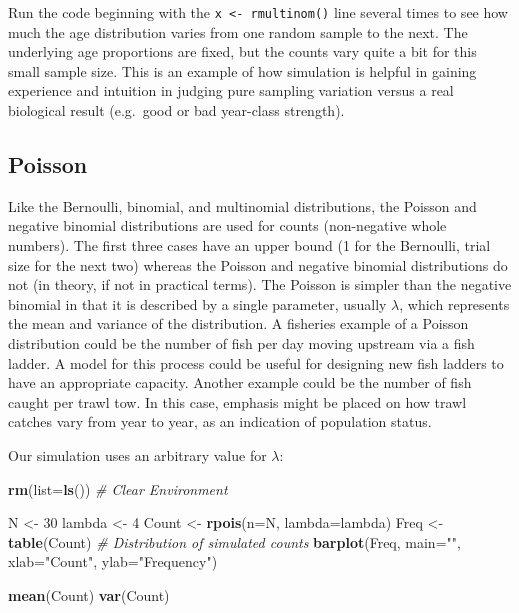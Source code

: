 \documentclass[
]{krantz}
\makeatletter
\newenvironment{Shaded}{\begin{snugshade}}{\end{snugshade}}
\newcommand{\AttributeTok}[1]{\textcolor[rgb]{0.27,0.27,0.27}{#1}}
\newcommand{\CommentTok}[1]{\textcolor[rgb]{0.37,0.37,0.37}{\textit{#1}}}
\newcommand{\DecValTok}[1]{\textcolor[rgb]{0.06,0.06,0.06}{#1}}
\newcommand{\FunctionTok}[1]{\textcolor[rgb]{0.27,0.27,0.27}{\textbf{#1}}}
\newcommand{\NormalTok}[1]{#1}
\newcommand{\OtherTok}[1]{\textcolor[rgb]{0.37,0.37,0.37}{#1}}
\newcommand{\StringTok}[1]{\textcolor[rgb]{0.5,0.5,0.5}{#1}}
\newenvironment{kframe}{%
\medskip{}
\setlength{\fboxsep}{.8em}
 \def\at@end@of@kframe{}%
 \ifinner\ifhmode%
  \def\at@end@of@kframe{\end{minipage}}%
  \begin{minipage}{\columnwidth}%
 \fi\fi%
 \def\FrameCommand##1{\hskip\@totalleftmargin \hskip-\fboxsep
 \colorbox{shadecolor}{##1}\hskip-\fboxsep
     \hskip-\linewidth \hskip-\@totalleftmargin \hskip\columnwidth}%
 \MakeFramed {\advance\hsize-\width
   \@totalleftmargin\z@ \linewidth\hsize
   \@setminipage}}%
 {\par\unskip\endMakeFramed%
 \at@end@of@kframe}
\renewenvironment{Shaded}{\begin{kframe}}{\end{kframe}}
\makeatother
\begin{document}
Run the code beginning with the \texttt{x\ \textless{}-\ rmultinom()} line several times to see how much the age distribution varies from one random sample to the next. The underlying age proportions are fixed, but the counts vary quite a bit for this small sample size. This is an example of how simulation is helpful in gaining experience and intuition in judging pure sampling variation versus a real biological result (e.g.~good or bad year-class strength).

\hypertarget{poisson}{%
\subsection{Poisson}\label{poisson}}

Like the Bernoulli, binomial, and multinomial distributions, the Poisson and negative binomial distributions are used for counts (non-negative whole numbers). The first three cases have an upper bound (1 for the Bernoulli, trial size for the next two) whereas the Poisson and negative binomial distributions do not (in theory, if not in practical terms). The Poisson is simpler than the negative binomial in that it is described by a single parameter, usually \(\lambda\), which represents the mean and variance of the distribution. A fisheries example of a Poisson distribution could be the number of fish per day moving upstream via a fish ladder. A model for this process could be useful for designing new fish ladders to have an appropriate capacity. Another example could be the number of fish caught per trawl tow. In this case, emphasis might be placed on how trawl catches vary from year to year, as an indication of population status.

Our simulation uses an arbitrary value for \(\lambda\):

\begin{Shaded}
\begin{Highlighting}[]
\FunctionTok{rm}\NormalTok{(}\AttributeTok{list=}\FunctionTok{ls}\NormalTok{()) }\CommentTok{\# Clear Environment}

\NormalTok{N }\OtherTok{\textless{}{-}} \DecValTok{30}
\NormalTok{lambda }\OtherTok{\textless{}{-}} \DecValTok{4}
\NormalTok{Count }\OtherTok{\textless{}{-}} \FunctionTok{rpois}\NormalTok{(}\AttributeTok{n=}\NormalTok{N, }\AttributeTok{lambda=}\NormalTok{lambda)}
\NormalTok{Freq }\OtherTok{\textless{}{-}} \FunctionTok{table}\NormalTok{(Count)  }\CommentTok{\# Distribution of simulated counts}
\FunctionTok{barplot}\NormalTok{(Freq, }\AttributeTok{main=}\StringTok{""}\NormalTok{, }\AttributeTok{xlab=}\StringTok{"Count"}\NormalTok{, }\AttributeTok{ylab=}\StringTok{"Frequency"}\NormalTok{)}

\FunctionTok{mean}\NormalTok{(Count)}
\FunctionTok{var}\NormalTok{(Count)}
\end{Highlighting}
\end{Shaded}
\end{document}
